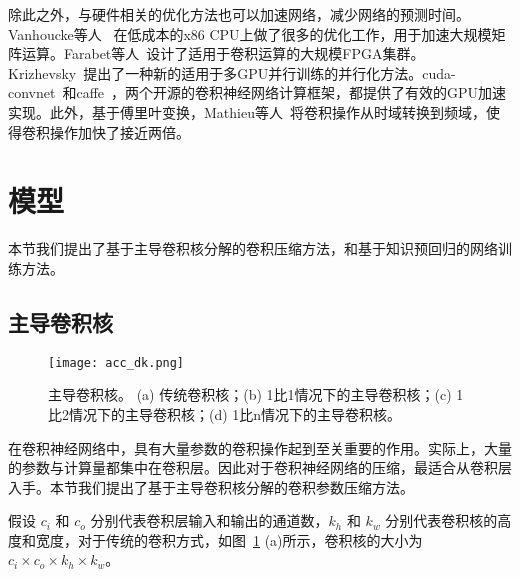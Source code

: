 除此之外，与硬件相关的优化方法也可以加速网络，减少网络的预测时间。Vanhoucke等人~\cite{vanhoucke2011improving} 在低成本的x86 CPU上做了很多的优化工作，用于加速大规模矩阵运算。Farabet等人~\cite{farabet2011large}设计了适用于卷积运算的大规模FPGA集群。Krizhevsky~\cite{krizhevsky2014one}提出了一种新的适用于多GPU并行训练的并行化方法。cuda-convnet~\cite{krizhevsky2012imagenet}和caffe~\cite{jia2014caffe}，两个开源的卷积神经网络计算框架，都提供了有效的GPU加速实现。此外，基于傅里叶变换，Mathieu等人~\cite{mathieu2013fast}将卷积操作从时域转换到频域，使得卷积操作加快了接近两倍。

\section{模型}
\label{sec:acc:model}

本节我们提出了基于主导卷积核分解的卷积压缩方法，和基于知识预回归的网络训练方法。

\subsection{主导卷积核}
\label{sec:acc:model:dk}

\begin{figure}
\centering
\texttt{[image: acc\_dk.png]}
\caption{主导卷积核。 (a) 传统卷积核；(b) 1比1情况下的主导卷积核；(c) 1比2情况下的主导卷积核；(d) 1比n情况下的主导卷积核。}
\label{fig:acc_dk}
\end{figure} 

在卷积神经网络中，具有大量参数的卷积操作起到至关重要的作用。实际上，大量的参数与计算量都集中在卷积层。因此对于卷积神经网络的压缩，最适合从卷积层入手。本节我们提出了基于主导卷积核分解的卷积参数压缩方法。

假设 $c_i$ 和 $c_o$ 分别代表卷积层输入和输出的通道数，$k_h$ 和 $k_w$ 分别代表卷积核的高度和宽度，对于传统的卷积方式，如图~\ref{fig:acc_dk} (a)所示，卷积核的大小为 $c_i{\times}c_o{\times}k_h{\times}k_w$。

